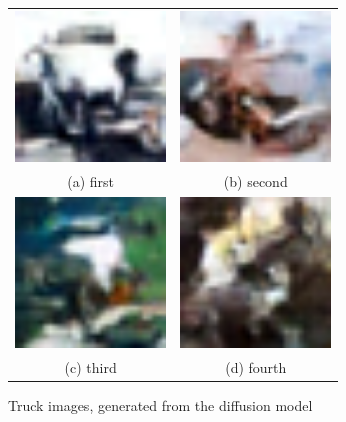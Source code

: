 \documentclass[conference]{IEEEtran}
\begin{document}
  \begin{figure}
    \begin{tabular}{cc}
      \includegraphics[width=40mm]{./images/generated-imgs/truck/0918.png} 
  &   \includegraphics[width=40mm]{./images/generated-imgs/truck/0919.png} 
  \\
    (a) first 
    & (b) second \\[6pt]
       \includegraphics[width=40mm]{./images/generated-imgs/truck/0920.png} 
    &  \includegraphics[width=40mm]{./images/generated-imgs/truck/0921.png} 
  \\
    (c) third & (d) fourth \\[6pt]
    \end{tabular}
    \caption{Truck images, generated from the diffusion model}
    \end{figure}
\end{document}
